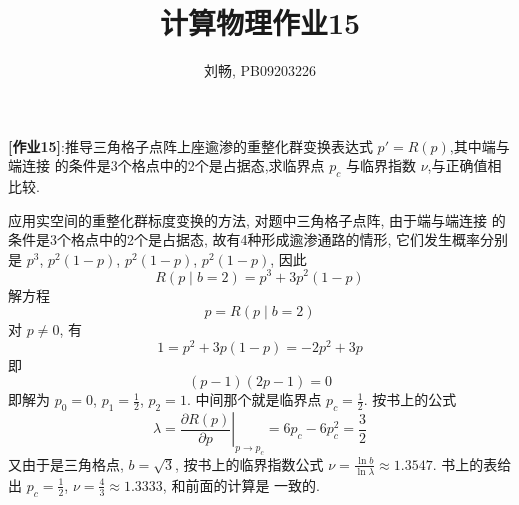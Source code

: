 \documentclass{ctexart}
\begin{document}
\title{计算物理作业15}
\author{刘畅, PB09203226}
\maketitle

{\bf[作业15]}:推导三角格子点阵上座逾渗的重整化群变换表达式 $p' = R(p)$,其中端与端连接
的条件是3个格点中的2个是占据态,求临界点 $p_c$ 与临界指数 $\nu$,与正确值相比较.

\bigbreak
应用实空间的重整化群标度变换的方法, 对题中三角格子点阵, 由于端与端连接
的条件是3个格点中的2个是占据态, 故有4种形成逾渗通路的情形, 它们发生概率分别是
$p^3$, $p^2(1-p)$, $p^2(1-p)$, $p^2(1-p)$, 因此
\[
R(p\mid b=2) = p^3+3p^2(1-p)
\]
解方程
\[
p = R(p \mid b=2)
\]
对 $p\neq0$, 有
\[
1=p^2+3p(1-p)=-2p^2+3p
\]
即
\[
(p-1)(2p-1)=0
\]
即解为 $p_0=0$, $p_1=\frac{1}{2}$, $p_2=1$. 中间那个就是临界点 $p_c = \frac{1}{2}$.
\medbreak
按书上的公式
\[
\lambda = \left.\frac{\partial R(p)}{\partial p}\right|_{p\to p_c}
=6p_c-6p_c^2=\frac{3}{2}
\]
又由于是三角格点, $b=\sqrt{3}$, 按书上的临界指数公式 $\nu=\frac{\ln b}{\ln \lambda}
\approx 1.3547$.
\medbreak
书上的表给出 $p_c=\frac{1}{2}$, $\nu=\frac{4}{3}\approx1.3333$, 和前面的计算是
一致的.
\end{document}

